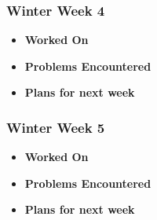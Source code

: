 \documentclass[compsoc,draftclsnofoot,onecolumn,10pt]{IEEEtran}
\begin{document}
\subsubsection{Winter Week 4}
\begin{itemize}
    \item {\textbf{Worked On}}
    \begin{itemize}

    \end{itemize}

    \item {\textbf{Problems Encountered}}
    \begin{itemize}

    \end{itemize}

    \item{\textbf{Plans for next week}}
    \begin{itemize}

    \end{itemize}

\end{itemize}

\subsubsection{Winter Week 5}
\begin{itemize}
    \item {\textbf{Worked On}}
    \begin{itemize}

    \end{itemize}

    \item {\textbf{Problems Encountered}}
    \begin{itemize}

    \end{itemize}

    \item{\textbf{Plans for next week}}
    \begin{itemize}

    \end{itemize}

\end{itemize}
\end{document}
